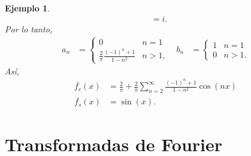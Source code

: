\documentclass[11pt,letterpaper,draft]{report}
\newtheorem{example}[defn]{Ejemplo}
\newcommand\<{\langle}
\renewcommand\>{\rangle}
\begin{document}
\begin{example}
\begin{align*}
    &=i.
  \end{align*}
  Por lo tanto,
  \begin{align*}
    a_n
    &=
    \begin{cases}
      0 & n=1 \\
      \frac{2}{\pi}\frac{(-1)^{n}+1}{1-n^{2}} & n>1,
    \end{cases}
    &
    b_n
    &=
    \begin{cases}
      1 & n=1 \\
      0 & n>1.
    \end{cases}
  \end{align*}
  Así,
  \begin{align*}
    \overline{f_c}(x)
    &=
    \frac{2}{\pi}
    +
    \frac{2}{\pi}
    \sum_{n=2}^{\infty}\frac{(-1)^{n}+1}{1-n^{2}}\cos(nx) \\
    \overline{f_s}(x)
    &= \sin(x).
  \end{align*}
\end{example}

\section{Transformadas de Fourier}
\end{document}
